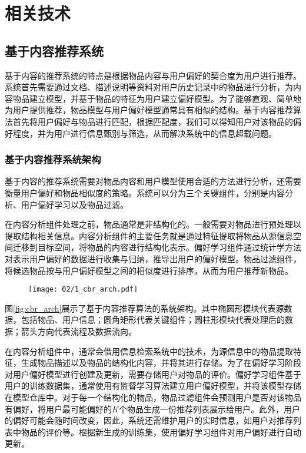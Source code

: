 \chapter{相关技术}
\label{chap:related}

\section{基于内容推荐系统}

基于内容的推荐系统的特点是根据物品内容与用户偏好的契合度为用户进行推荐\cite{lops2011content}。系统首先需要通过文档、描述说明等资料对用户历史记录中的物品进行分析，为内容物品建立模型，并基于物品的特征为用户建立偏好模型。为了能够直观、简单地为用户提供推荐，物品模型与用户偏好模型通常具有相似的结构。基于内容推荐算法首先将用户偏好与物品进行匹配，根据匹配度，我们可以得知用户对该物品的偏好程度，并为用户进行信息甄别与筛选，从而解决系统中的信息超载问题。

\subsection{基于内容推荐系统架构}
基于内容的推荐系统需要对物品内容和用户模型使用合适的方法进行分析，还需要衡量用户偏好和物品相似度的策略。系统可以分为三个关键组件，分别是内容分析、用户偏好学习以及物品过滤。

在内容分析组件处理之前，物品通常是非结构化的。一般需要对物品进行预处理以提取结构相关信息。内容分析组件的主要任务就是通过特征提取将物品从源信息空间迁移到目标空间，将物品的内容进行结构化表示。偏好学习组件通过统计学方法对表示用户偏好的数据进行收集与归纳，推导出用户的偏好模型。物品过滤组件，将候选物品按与用户偏好模型之间的相似度进行排序，从而为用户推荐新物品\cite{herlocker2004evaluating}。

\begin{figure}
 \centering
 \texttt{[image: 02/1\_cbr\_arch.pdf]}
\end{figure}

图\ref{fig:cbr_arch}展示了基于内容推荐算法的系统架构。其中椭圆形模块代表源数据，包括物品、用户信息；圆角矩形代表关键组件；圆柱形模块代表处理后的数据；箭头方向代表流程及数据流向。

在内容分析组件中，通常会借用信息检索系统中的技术，为源信息中的物品提取特征，生成物品描述以及物品的结构化内容，并将其进行存储。为了在偏好学习阶段对用户偏好模型进行创建及更新，需要存储用户对物品的评价。偏好学习组件基于用户的训练数据集，通常使用有监督学习算法建立用户偏好模型，并将该模型存储在模型仓库中。对于每一个结构化的物品，物品过滤组件会预测用户是否对该物品有偏好，将用户最可能偏好的$K$个物品生成一份推荐列表展示给用户。此外，用户的偏好可能会随时间改变，因此，系统还需维护用户的实时信息，如用户对推荐列表中物品的评价等。根据新生成的训练集，使用偏好学习组件对用户偏好进行自动更新。

